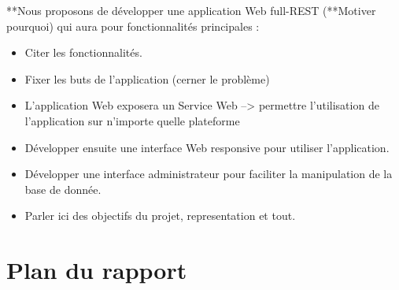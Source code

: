 		
**Nous proposons de développer une application Web full-REST (**Motiver pourquoi) qui aura pour fonctionnalités principales : 
\begin{itemize}
	\item Citer les fonctionnalités.
	\item Fixer les buts de l'application (cerner le problème)
	\item L'application Web exposera un Service Web --> permettre l'utilisation de l'application sur n'importe quelle plateforme 
	\item Développer ensuite une interface Web responsive pour utiliser l'application.
	\item Développer une interface administrateur pour faciliter la manipulation de la  base de donnée.
	\item Parler ici des objectifs du projet, representation et tout.
\end{itemize}
		 
		 
\newpage
\section{Plan du rapport}